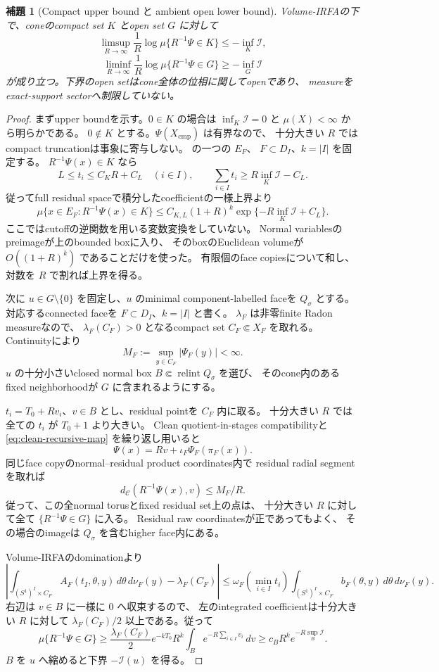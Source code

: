 \documentclass[11pt,a4paper]{ltjsarticle}
\newcommand{\cC}{\mathcal C}
\newcommand{\cI}{\mathcal I}
\theoremstyle{plain}
\newtheorem{lemma}[lemma]{補題}
\theoremstyle{definition}
\theoremstyle{remark}
\begin{document}
\begin{lemma}[Compact upper bound と ambient open lower bound]
\label{lem:cellwise-LDP}
Volume-IRFAの下で、coneのcompact set $K$ とopen set $G$ に対して
\[
 \limsup_{R\to\infty}\frac1R
 \log\mu\{R^{-1}\Psi\in K\}
 \le-\inf_K\cI,
\]
\[
 \liminf_{R\to\infty}\frac1R
 \log\mu\{R^{-1}\Psi\in G\}
 \ge-\inf_G\cI
\]
が成り立つ。下界のopen setはcone全体の位相に関してopenであり、
measureをexact-support sectorへ制限していない。
\end{lemma}
\begin{proof}
まずupper boundを示す。$0\in K$ の場合は
$\inf_K\cI=0$ と $\mu(X)<\infty$ から明らかである。
$0\notin K$ とする。$\Psi(X_{\mathrm{cmp}})$ は有界なので、
十分大きい $R$ ではcompact truncationは事象に寄与しない。
 の一つの $E_F$、
$F\subset D_I$、$k=|I|$ を固定する。
$R^{-1}\Psi(x)\in K$ なら
\[
 L\le t_i\le C_KR+C_L\quad(i\in I),
 \qquad
 \sum_{i\in I}t_i\ge R\inf_K\cI-C_L.
\]
従ってfull residual spaceで積分したcoefficientの一様上界より
\[
 \mu\{x\in E_F:R^{-1}\Psi(x)\in K\}
 \le C_{K,L}(1+R)^k
       \exp\{-R\inf_K\cI+C_L\}.
\]
ここではcutoffの逆関数を用いる変数変換をしていない。
Normal variablesのpreimageが上のbounded boxに入り、
そのboxのEuclidean volumeが $O((1+R)^k)$ であることだけを使った。
有限個のface copiesについて和し、対数を $R$ で割れば上界を得る。

次に $u\in G\setminus\{0\}$ を固定し、$u$ のminimal
component-labelled faceを $Q_\sigma$ とする。
対応するconnected faceを $F\subset D_I$、$k=|I|$ と書く。
$\lambda_F$ は非零finite Radon measureなので、
$\lambda_F(C_F)>0$ となるcompact set $C_F\Subset X_F$ を取れる。
Continuityにより
\[
 M_F:=\sup_{y\in C_F}|\Psi_F(y)|<\infty.
\]
$u$ の十分小さいclosed normal box
$B\Subset\operatorname{relint}Q_\sigma$ を選び、
そのcone内のあるfixed neighborhoodが $G$ に含まれるようにする。

$t_i=T_0+Rv_i$、$v\in B$ とし、residual pointを $C_F$ 内に取る。
十分大きい $R$ では全ての $t_i$ が $T_0+1$ より大きい。
Clean quotient-in-stages compatibilityと
\eqref{eq:clean-recursive-map} を繰り返し用いると
\[
 \Psi(x)=Rv+\iota_F\Psi_F(\pi_F(x)).
\]
同じface copyのnormal--residual product coordinates内で
residual radial segmentを取れば
\[
 d_{\cC}(R^{-1}\Psi(x),v)\le M_F/R.
\]
従って、この全normal torusとfixed residual set上の点は、
十分大きい $R$ に対して全て $\{R^{-1}\Psi\in G\}$ に入る。
Residual raw coordinatesが正であってもよく、
その場合のimageは $Q_\sigma$ を含むhigher face内にある。

Volume-IRFAのdominationより
\[
 \left|
 \int_{(S^1)^I\times C_F}A_F(t_I,\theta,y)\,
           d\theta\,d\nu_F(y)-\lambda_F(C_F)
 \right|
 \le
 \omega_F\!\left(\min_{i\in I}t_i\right)
 \int_{(S^1)^I\times C_F}b_F(\theta,y)\,
           d\theta\,d\nu_F(y).
\]
右辺は $v\in B$ に一様に $0$ へ収束するので、
左のintegrated coefficientは十分大きい $R$ に対して
$\lambda_F(C_F)/2$ 以上である。従って
\[
 \mu\{R^{-1}\Psi\in G\}
 \ge
 \frac{\lambda_F(C_F)}2 e^{-kT_0}R^k
 \int_B e^{-R\sum_{i\in I}v_i}\,dv
 \ge c_B R^k e^{-R\sup_B\cI}.
\]
$B$ を $u$ へ縮めると下界 $-\cI(u)$ を得る。


\end{proof}
\end{document}
